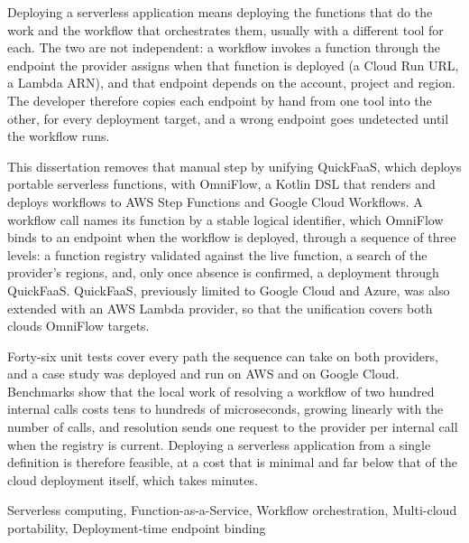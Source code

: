 Deploying a serverless application means deploying the functions that do the work and the workflow
that orchestrates them, usually with a different tool for each. The two are not independent: a
workflow invokes a function through the endpoint the provider assigns when that function is deployed
(a Cloud Run URL, a Lambda ARN), and that endpoint depends on the account, project and region. The
developer therefore copies each endpoint by hand from one tool into the other, for every deployment
target, and a wrong endpoint goes undetected until the workflow runs.

This dissertation removes that manual step by unifying QuickFaaS, which deploys portable serverless
functions, with OmniFlow, a Kotlin DSL that renders and deploys workflows to AWS Step Functions and
Google Cloud Workflows. A workflow call names its function by a stable logical identifier, which
OmniFlow binds to an endpoint when the workflow is deployed, through a sequence of three levels: a
function registry validated against the live function, a search of the provider's regions, and, only
once absence is confirmed, a deployment through QuickFaaS. QuickFaaS, previously limited to Google
Cloud and Azure, was also extended with an AWS Lambda provider, so that the unification covers both
clouds OmniFlow targets.

Forty-six unit tests cover every path the sequence can take on both providers, and a case study was
deployed and run on AWS and on Google Cloud. Benchmarks show that the local work of resolving a workflow of two
hundred internal calls costs tens to hundreds of microseconds, growing linearly with the number of calls, and
resolution sends one request to the provider per internal call when the registry is current.
Deploying a serverless application from a single definition is therefore feasible, at a cost that is
minimal and far below that of the cloud deployment itself, which takes minutes.
\begin{keywords}
Serverless computing, Function-as-a-Service, Workflow orchestration, Multi-cloud portability,
Deployment-time endpoint binding
\end{keywords}
